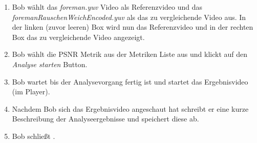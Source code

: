 \begin{enumerate}
\item Bob wählt das \emph{foreman.yuv} Video als Referenzvideo und das \emph{foremanRauschenWeichEncoded.yuv} als das zu vergleichende Video aus. In der linken (zuvor leeren) Box wird nun das Referenzvideo und in der rechten Box das zu vergleichende Video angezeigt.
\item Bob wählt die PSNR Metrik aus der Metriken Liste aus und klickt auf den \emph{Analyse starten} Button.
\item Bob wartet bis der Analysevorgang fertig ist und startet das Ergebnisvideo (im Player).
\item Nachdem Bob sich das Ergebnisvideo angeschaut hat schreibt er eine kurze Beschreibung der Analyseergebnisse und speichert diese ab.
\item Bob schließt \projektTitel.
\end{enumerate}
